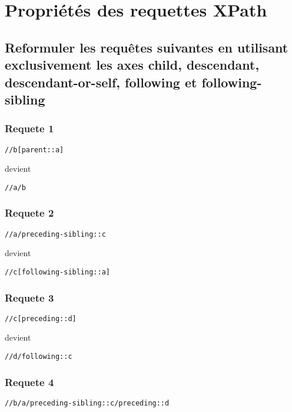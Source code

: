 \chapter{Propriétés des requettes XPath}
\section{Reformuler les requêtes suivantes en utilisant exclusivement les axes child, descendant, descendant-or-self, following et following-sibling}
\subsection{Requete 1}
\begin{verbatim}
//b[parent::a]
\end{verbatim}

devient

\begin{verbatim}
//a/b
\end{verbatim}

\subsection{Requete 2}
\begin{verbatim}
//a/preceding-sibling::c
\end{verbatim}

devient

\begin{verbatim}
//c[following-sibling::a]
\end{verbatim}

\subsection{Requete 3}
\begin{verbatim}
//c[preceding::d]
\end{verbatim}

devient

\begin{verbatim}
//d/following::c
\end{verbatim}

\subsection{Requete 4}
\begin{verbatim}
//b/a/preceding-sibling::c/preceding::d
\end{verbatim}

